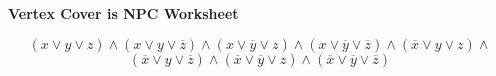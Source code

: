 \documentclass[12pt]{article}
\begin{document}
\newcommand{\I}{\mbox{{\em Int}}}
\newcommand{\lt}{\mbox{{\em left}}}
\newcommand{\rt}{\mbox{{\em right}}}
\newcommand{\ld}{\Delta^l}
\newcommand{\rd}{\Delta^r}
\newcommand{\lsp}[1]{\large\renewcommand{\baselinestretch}{#1}\normalsize}
\newcommand{\hsp}{\hspace{.2in}}

\def\Endwhile{\mbox{\bf endwhile\ }}
\def\Or{\mbox{\bf or\ }}
\def\Do{\mbox{\bf do\ }}
\def\Downto{\mbox{\bf downto\ }}
\def\Int{\mbox{\bf int\ }}
\def\To{\mbox{\bf to\ }}
\def\Repeat{\mbox{\bf repeat\ }}
\def\Until{\mbox{\bf until\ }}
\def\Return{\mbox{\bf return\ }}
\def\Not{\mbox{\bf not\ }}
\def\And{\mbox{\bf and\ }}
\def\For{\mbox{\bf for\ }}
\def\Foreach{\mbox{\bf foreach\ }}
\def\Else{\mbox{\bf else\ }}
\def\Elseif{\mbox{\bf elseif\ }}
\def\End{\mbox{\bf end\ }}
\def\If{\mbox{\bf if\ }}
\def\Mod{\mbox{\bf \ mod\ }}
\def\Then{\mbox{\bf then\ }}
\def\While{\mbox{\bf while\ }}
\def\Output{\mbox{\bf output\ }}


\lsp{1}
\pagestyle{plain}
\begin{center}
{\bf
Vertex Cover is NPC Worksheet 
}
\end{center}

\[
\left(x \vee y \vee z\right) \wedge 
\left(x \vee y \vee \overline{z}\right) \wedge 
\left(x \vee \overline{y} \vee z\right) \wedge 
\left(x \vee \overline{y} \vee \overline{z}\right) \wedge 
\left(\overline{x} \vee y \vee z\right) \wedge\] 
\[
\left(\overline{x} \vee y \vee \overline{z}\right) \wedge 
\left(\overline{x} \vee \overline{y} \vee z\right) \wedge 
\left(\overline{x} \vee \overline{y} \vee \overline{z}\right)
\]

\vspace*{0.05in}
\end{document}
